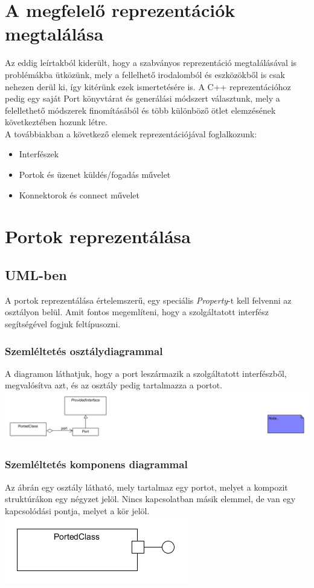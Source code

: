 \documentclass[a4paper,12pt]{report}
\begin{document}
\section{A megfelelő reprezentációk megtalálása}
Az eddig leírtakból kiderült, hogy a szabványos reprezentáció megtalálásával is problémákba ütközünk, mely a fellelhető irodalomból és eszközökből is csak nehezen derül ki, így kitérünk ezek ismertetésére is. A C++ reprezentációhoz pedig egy saját Port könyvtárat és generálási módszert választunk, mely a felellethető módszerek finomításából és több különböző ötlet elemzésének következtében hozunk létre. \\

A továbbiakban a következő elemek reprezentációjával foglalkozunk:
\begin{itemize}
\item Interfészek
\item Portok és üzenet küldés/fogadás művelet
\item Konnektorok és connect művelet
\end{itemize}

\section{Portok reprezentálása}

\subsection{UML-ben}
A portok reprezentálása értelemszerű, egy speciális \textit{Property}-t kell felvenni az osztályon belül. Amit fontos megemlíteni, hogy a szolgáltatott interfész segítségével fogjuk feltípusozni. 


\subsubsection{Szemléltetés osztálydiagrammal}
A diagramon láthatjuk, hogy a port leszármazik a szolgáltatott interfészből, megvalósítva azt, és az osztály pedig tartalmazza a portot.
\includegraphics[scale=0.8]{uml_port_class.png}

\subsubsection{Szemléltetés komponens diagrammal}
Az ábrán egy osztály látható, mely tartalmaz egy portot, melyet a kompozit struktúrákon egy négyzet jelöl. Nincs kapcsolatban másik elemmel, de van egy kapcsolódási pontja, melyet a kör jelöl. \\
\includegraphics[scale=0.7]{uml_port_comp.png}
\end{document}

